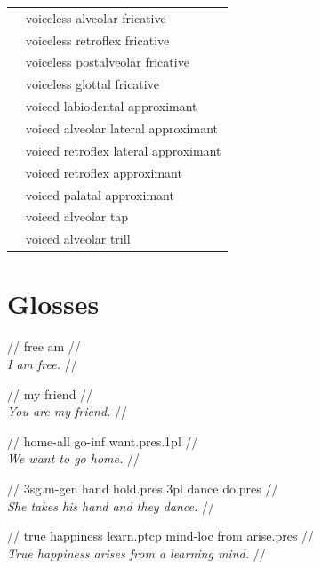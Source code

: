 \documentclass{article}
\begin{document}
\begin{xltabular}{\textwidth}{lL}
   & voiceless alveolar fricative \\
   & voiceless retroflex fricative \\
   & voiceless postalveolar fricative \\
   & voiceless glottal fricative \\
   & voiced labiodental approximant \\
   & voiced alveolar lateral approximant \\
   & voiced retroflex lateral approximant \\
   & voiced retroflex approximant \\
   & voiced palatal approximant \\
   & voiced alveolar tap \\
   & voiced alveolar trill \\
\end{xltabular}

\newpage\section{Glosses}

\ex
\begingl
\gla {}   //
 free am //
\\\textit{I am free.} //
\endgl
\xe

\ex
\begingl
\gla {}   //
 my friend //
\\\textit{You are my friend.} //
\endgl
\xe

\ex
\begingl
\gla {}    //
 home-{\sc all} go-{\sc inf} want.{\sc pres.1pl} //
\\\textit{We want to go home.} //
\endgl
\xe

\ex
\begingl
\gla {}       //
 {\sc 3sg.m}-{\sc gen} hand hold.{\sc pres} {\sc 3pl} dance do.{\sc pres} //
\\\textit{She takes his hand and they dance.} //
\endgl
\xe

\ex
\begingl
\gla {}      //
\glb true happiness learn.{\sc ptcp} mind-{\sc loc} from arise.{\sc pres} //
\\\textit{True happiness arises from a learning mind.} //
\endgl
\xe
\end{document}
